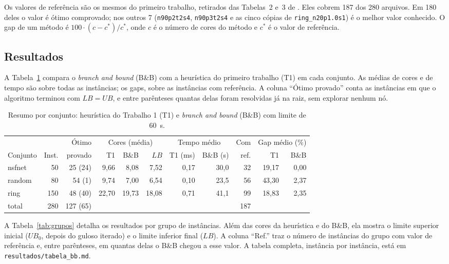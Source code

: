 \documentclass[12pt]{article}
\newcommand{\LB}{\mathit{LB}}
\newcommand{\UB}{\mathit{UB}}
\begin{document}
Os valores de referência são os mesmos do primeiro trabalho, retirados das
Tabelas~2 e~3 de \cite{furini2018}. Eles cobrem 187 dos 280 arquivos. Em 180
deles o valor é ótimo comprovado; nos outros 7 (\texttt{n90p2t2s4},
\texttt{n90p3t2s4} e as cinco cópias de \texttt{ring\_n20p1.0s1}) é o melhor
valor conhecido. O gap de um método é $100\cdot(c-c^*)/c^*$, onde $c$ é o
número de cores do método e $c^*$ é o valor de referência.

\subsection{Resultados}

A Tabela~\ref{tab:resumo} compara o \emph{branch and bound} (B\&B) com a
heurística do primeiro trabalho (T1) em cada conjunto. As médias de cores e de
tempo são sobre todas as instâncias; os gaps, sobre as instâncias com
referência. A coluna ``Ótimo provado'' conta as instâncias em que o
algoritmo terminou com $\LB=\UB$, e entre parênteses quantas delas foram
resolvidas já na raiz, sem explorar nenhum nó.

\begin{table}[ht]
  \centering
  \caption{Resumo por conjunto: heurística do Trabalho 1 (T1) e
    \emph{branch and bound} (B\&B) com limite de 60~s.}
  \label{tab:resumo}
  \footnotesize\setlength{\tabcolsep}{3.5pt}
  \begin{tabular}{lrrrrrrrrrr}
    \toprule
    & & Ótimo & \multicolumn{3}{c}{Cores (média)} & \multicolumn{2}{c}{Tempo médio} & Com & \multicolumn{2}{c}{Gap médio (\%)} \\
    \cmidrule(lr){4-6}\cmidrule(lr){7-8}\cmidrule(lr){10-11}
    Conjunto & Inst. & provado & T1 & B\&B & $\LB$ & T1 (ms) & B\&B (s) & ref. & T1 & B\&B \\
    \midrule
    nsfnet & 50  & 25 (24) & 9,66  & 8,08  & 7,52  & 0,17 & 30,0 & 32 & 19,17 & 0,00 \\
    random & 80  & 54 (1)  & 9,74  & 7,00  & 6,54  & 0,10 & 23,5 & 56 & 43,30 & 2,37 \\
    ring   & 150 & 48 (40) & 22,70 & 19,73 & 18,08 & 0,71 & 41,1 & 99 & 18,83 & 2,35 \\
    \midrule
    total  & 280 & 127 (65) & & & & & & 187 & & \\
    \bottomrule
  \end{tabular}
\end{table}

A Tabela~\ref{tab:grupos} detalha os resultados por grupo de instâncias. Além
das cores da heurística e do B\&B, ela mostra o limite superior inicial
($\UB_0$, depois do guloso iterado) e o limite inferior final ($\LB$). A
coluna ``Ref.'' traz o número de instâncias do grupo com valor de referência
e, entre parênteses, em quantas delas o B\&B chegou a esse valor. A tabela
completa, instância por instância, está em \texttt{resultados/tabela\_bb.md}.
\end{document}
